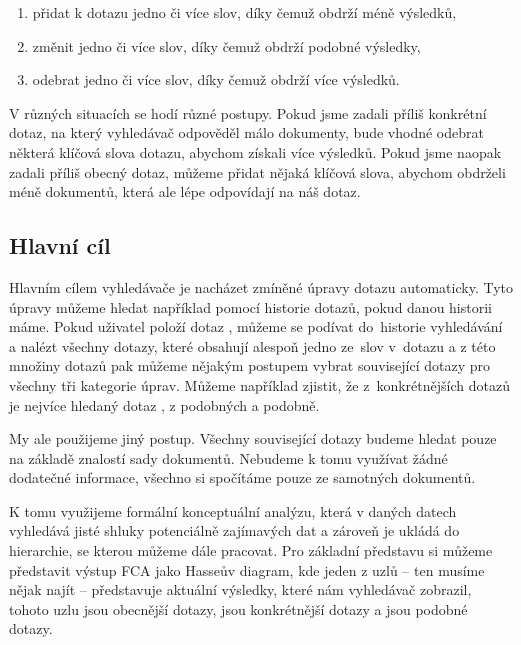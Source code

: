 \documentclass{article}
\begin{document}
\begin{enumerate}
\item přidat k dotazu jedno či více slov, díky čemuž obdrží méně výsledků,
\item změnit jedno či více slov, díky čemuž obdrží podobné výsledky,
\item odebrat jedno či více slov, díky čemuž obdrží více výsledků.
\end{enumerate}

V různých situacích se hodí různé postupy. Pokud jsme zadali příliš konkrétní dotaz, na který vyhledávač odpověděl málo dokumenty, bude vhodné odebrat některá klíčová slova dotazu, abychom získali více výsledků. Pokud jsme naopak zadali příliš obecný dotaz, můžeme přidat nějaká klíčová slova, abychom obdrželi méně dokumentů, která ale lépe odpovídají na náš dotaz. 

\subsection{Hlavní cíl}

Hlavním cílem vyhledávače je nacházet zmíněné úpravy dotazu automaticky. Tyto úpravy můžeme hledat například pomocí historie dotazů, pokud danou historii máme. Pokud uživatel položí dotaz , můžeme se podívat do~historie vyhledávání a nalézt všechny dotazy, které obsahují alespoň jedno ze~slov v~dotazu a z této množiny dotazů pak můžeme nějakým postupem vybrat související dotazy pro všechny tři kategorie úprav. Můžeme například zjistit, že z~konkrétnějších dotazů je nejvíce hledaný dotaz , z podobných  a podobně. 

My ale použijeme jiný postup. Všechny související dotazy budeme hledat pouze na základě znalostí sady dokumentů. Nebudeme k tomu využívat žádné dodatečné informace, všechno si spočítáme pouze ze samotných dokumentů.

K tomu využijeme formální konceptuální analýzu, která v daných datech vyhledává jisté shluky potenciálně zajímavých dat a zároveň je ukládá do hierarchie, se kterou můžeme dále pracovat. Pro základní představu si můžeme představit výstup FCA jako Hasseův diagram, kde jeden z uzlů -- ten musíme nějak najít -- představuje aktuální výsledky, které nám vyhledávač zobrazil,  tohoto uzlu jsou obecnější dotazy,  jsou konkrétnější dotazy a  jsou podobné dotazy. 
\end{document}
